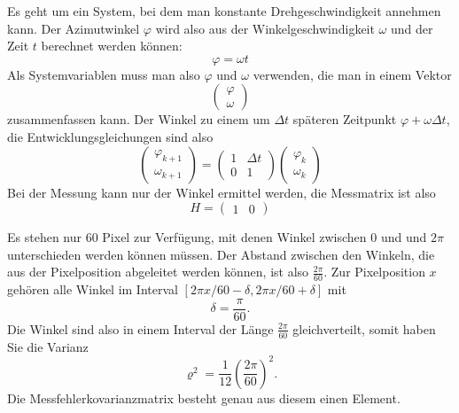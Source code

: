 \begin{loesung}
\begin{teilaufgaben}
\item
Es geht um ein System, bei dem man konstante Drehgeschwindigkeit annehmen
kann. Der Azimutwinkel $\varphi$ wird also aus der Winkelgeschwindigkeit
$\omega$ und der Zeit $t$ berechnet werden können:
\[
\varphi=\omega t
\]
Als Systemvariablen muss man also $\varphi$ und $\omega$ verwenden,
die man in einem Vektor
\[
\begin{pmatrix}\varphi\\\omega\end{pmatrix}
\]
zusammenfassen kann. Der Winkel zu einem um $\Delta t$ späteren Zeitpunkt
$\varphi+\omega\Delta t$, die Entwicklungsgleichungen sind also
\[
\begin{pmatrix}\varphi_{k+1}\\\omega_{k+1}\end{pmatrix}
=\begin{pmatrix}1&\Delta t\\0&1\end{pmatrix}
\begin{pmatrix}\varphi_k\\\omega_k\end{pmatrix}
\]
Bei der Messung kann nur der Winkel ermittel werden, die Messmatrix ist
also
\[
H=\begin{pmatrix}1&0\end{pmatrix}
\]
\item
Es stehen nur 60 Pixel zur Verfügung, mit denen Winkel zwischen $0$ und
und $2\pi$ unterschieden werden können müssen.
Der Abstand zwischen den Winkeln, die aus der Pixelposition abgeleitet
werden können, ist also $\frac{2\pi}{60}$. Zur Pixelposition $x$ gehören
alle Winkel im Interval $[2\pi x/60-\delta, 2\pi x/60+\delta]$ mit
\[
\delta=\frac{\pi}{60}.
\]
Die Winkel sind also in einem Interval der Länge $\frac{2\pi}{60}$ gleichverteilt,
somit haben Sie die Varianz
\[
\varrho^2=\frac1{12}\left(\frac{2\pi}{60}\right)^2.
\]
Die Messfehlerkovarianzmatrix besteht genau aus diesem einen Element.
\qedhere
\end{teilaufgaben}
\end{loesung}

